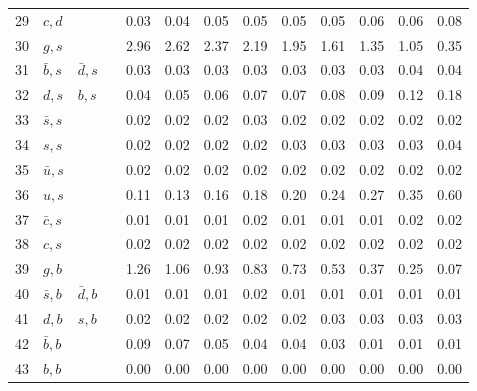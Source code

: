 \begin{tabularx}{\textwidth}{rXXX@{}S@{}S@{}S@{}S@{}S@{}S@{}S@{}S@{}S}
 29 & $c, d$           &                   &                  &  0.03 &  0.04 &  0.05 &  0.05 &  0.05 &  0.05 &  0.06 &  0.06 &  0.08 \\
 30 & $g, s$           &                   &                  &  2.96 &  2.62 &  2.37 &  2.19 &  1.95 &  1.61 &  1.35 &  1.05 &  0.35 \\
 31 & $\bar b, s$      & $\bar d, s$       &                  &  0.03 &  0.03 &  0.03 &  0.03 &  0.03 &  0.03 &  0.03 &  0.04 &  0.04 \\
 32 & $d, s$           & $b, s$            &                  &  0.04 &  0.05 &  0.06 &  0.07 &  0.07 &  0.08 &  0.09 &  0.12 &  0.18 \\
 33 & $\bar s, s$      &                   &                  &  0.02 &  0.02 &  0.02 &  0.03 &  0.02 &  0.02 &  0.02 &  0.02 &  0.02 \\
 34 & $s, s$           &                   &                  &  0.02 &  0.02 &  0.02 &  0.02 &  0.03 &  0.03 &  0.03 &  0.03 &  0.04 \\
 35 & $\bar u, s$      &                   &                  &  0.02 &  0.02 &  0.02 &  0.02 &  0.02 &  0.02 &  0.02 &  0.02 &  0.02 \\
 36 & $u, s$           &                   &                  &  0.11 &  0.13 &  0.16 &  0.18 &  0.20 &  0.24 &  0.27 &  0.35 &  0.60 \\
 37 & $\bar c, s$      &                   &                  &  0.01 &  0.01 &  0.01 &  0.02 &  0.01 &  0.01 &  0.01 &  0.02 &  0.02 \\
 38 & $c, s$           &                   &                  &  0.02 &  0.02 &  0.02 &  0.02 &  0.02 &  0.02 &  0.02 &  0.02 &  0.02 \\
 39 & $g,  b$          &                   &                  &  1.26 &  1.06 &  0.93 &  0.83 &  0.73 &  0.53 &  0.37 &  0.25 &  0.07 \\
 40 & $\bar s, b$      & $\bar d, b$       &                  &  0.01 &  0.01 &  0.01 &  0.02 &  0.01 &  0.01 &  0.01 &  0.01 &  0.01 \\
 41 & $d, b$           & $s, b$            &                  &  0.02 &  0.02 &  0.02 &  0.02 &  0.02 &  0.03 &  0.03 &  0.03 &  0.03 \\
 42 & $\bar b, b$      &                   &                  &  0.09 &  0.07 &  0.05 &  0.04 &  0.04 &  0.03 &  0.01 &  0.01 &  0.01 \\
 43 & $b, b$           &                   &                  &  0.00 &  0.00 &  0.00 &  0.00 &  0.00 &  0.00 &  0.00 &  0.00 &  0.00 \\

\end{tabularx}
